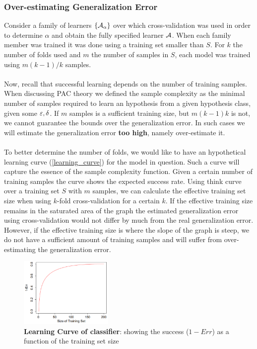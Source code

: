 \subsubsection{Over-estimating Generalization Error}
Consider a family of learners $\left\{\mathcal{A}_\alpha\right\}$ over which cross-validation was used in order to determine $\alpha$ and obtain the fully specified learner $\mathcal{A}$. When each family member was trained it was done using a training set smaller than $S$. For $k$ the number of folds used and $m$ the number of samples in $S$, each model was trained using $m\left(k-1\right)/k$ samples.
\\~\\
Now, recall that successful learning depends on the number of training samples. When discussing PAC theory we defined the sample complexity as the minimal number of samples required to learn an hypothesis from a given hypothesis class, given some $\varepsilon,\delta$. If $m$ samples is a sufficient training size, but $m\left(k-1\right)k$ is not, we cannot guarantee the bounds over the generalization error. In such cases we will estimate the generalization error \textbf{too high}, namely over-estimate it.
\\~\\
To better determine the number of folds, we would like to have an hypothetical learning curve (\autoref{learning_curve}) for the model in question. Such a curve will capture the essence of the sample complexity function. Given a certain number of training samples the curve shows the expected success rate. Using think curve over a training set $S$ with $m$ samples, we can calculate the effective training set size when using $k$-fold cross-validation for a certain $k$. If the effective training size remains in the saturated area of the graph the estimated generalization error using cross-validation would not differ by much from the real generalization error. However, if the effective training size is where the slope of the graph is steep, we do not have a sufficient amount of training samples and will suffer from over-estimating the generalization error.


\begin{figure}[!h]
	\centering
	\includegraphics[width=0.4\textwidth]{chapters/regularization.model.selection/figures/learning_curve.png}
	\caption{\textbf{Learning Curve of classifier}: showing the success ($1-Err$) as a function of the training set size}
	\label{learning_curve}
\end{figure}
